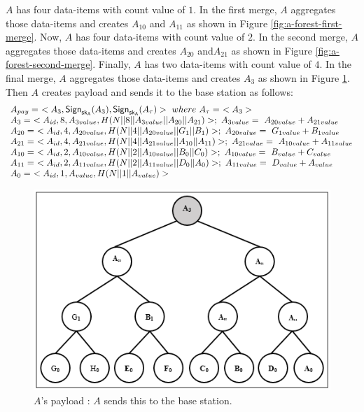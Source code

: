 		$A$ has four data-items with count value of $1$.
		In the first merge, $A$ aggregates those data-items and creates $A_{10}$ and $A_{11}$ as shown in Figure \ref{fig:a-forest-first-merge}.
		Now, $A$ has four data-items with count value of $2$.
		In the second merge, $A$ aggregates those data-items and creates $A_{20}$ and$A_{21}$ as shown in Figure \ref{fig:a-forest-second-merge}.
		Finally, $A$ has two data-items with count value of $4$.
		In the final merge, $A$ aggregates those data-items and creates $A_{3}$ as shown in Figure \ref{fig:a-payload}.
		Then $A$ creates payload and sends it to the base station as follows:
			\begin{equation*}
				\begin{array}{l}
					A_{pay} =\ <A_{3},\textsf{Sign}_{\sk_{A}}(A_{3}),\textsf{Sign}_{\sk_{A}}(A_{\tau})>\ where\ A_{\tau} =\ <A_{3}>\\
					A_{3} =\ <A_{id}, 8, A_{3value}, H(N||8||A_{3value}||A_{20}||A_{21})>;\ A_{3value} =\ A_{20value} + A_{21value}\\
					A_{20} =\ <A_{id},4,A_{20value},H(N||4||A_{20value}||G_{1}||B_{1})>;\ A_{20value} =\ G_{1value} + B_{1value}\\ 
					A_{21} =\ <A_{id},4,A_{21value},H(N||4||A_{21value}||A_{10}||A_{11})>;\ A_{21value} =\ A_{10value} + A_{11value}\\ 
					A_{10} =\ <A_{id},2,A_{10value},H(N||2||A_{10value}||B_{0}||C_{0})>;\ A_{10value} =\ B_{value} + C_{value}\\
					A_{11} =\ <A_{id},2,A_{11value},H(N||2||A_{11value}||D_{0}||A_{0})>;\ A_{11value} =\ D_{value} + A_{value}\\
					A_{0} =\ <A_{id},1,A_{value},H(N||1||A_{value})>
				\end{array}
			\end{equation*}
		\begin{figure}[h!]
			\centering
			\includegraphics{images/a-payload.png}
			\caption{$A$'s payload : $A$ sends this to the base station.}
			\label{fig:a-payload}
		\end{figure}

